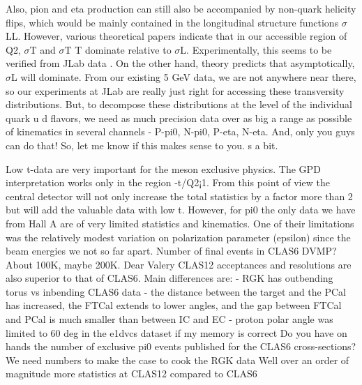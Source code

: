             Also, pion and eta production can still also be accompanied by non-quark helicity flips,
            which would be mainly contained in the longitudinal structure functions $\sigma$LL. However,
            various theoretical papers indicate that in our accessible region of Q2, $\sigma$T and $\sigma$T T dominate
            relative to $\sigma$L. Experimentally, this seems to be verified from JLab data . On the other
            hand, theory predicts that asymptotically, $\sigma$L will dominate. From our existing 5 GeV data,
            we are not anywhere near there, so our experiments at JLab are really just right for accessing
            these transversity distributions. But, to decompose these distributions at the level of the
            individual quark u d flavors, we need as much precision data over as big a range as possible
            of kinematics in several channels - P-pi0, N-pi0, P-eta, N-eta. And, only you guys can do
            that! So, let me know if this makes sense to you. s a bit.
                       
            
            Low t-data are very important for the meson exclusive physics. The GPD interpretation
            works only in the region -t/Q2¡1. From this point of view the central detector will not only
            increase the total statistics by a factor more than 2 but will add the valuable data with low
            t.
            However, for pi0 the only data we have from Hall A are of very limited statistics and
            kinematics. One of their limitations was the relatively modest variation on polarization
            parameter (epsilon) since the beam energies we not so far apart.
            Number of final events in CLAS6 DVMP? About 100K, maybe 200K.
            Dear Valery
            CLAS12 acceptances and resolutions are also superior to that of CLAS6. Main differences
            are: - RGK has outbending torus vs inbending CLAS6 data - the distance between the target
            and the PCal has increased, the FTCal extends to lower angles, and the gap between FTCal
            and PCal is much smaller than between IC and EC - proton polar angle was limited to 60
            deg in the e1dvcs dataset if my memory is correct
            Do you have on hands the number of exclusive pi0 events published for the CLAS6
            cross-sections? We need numbers to make the case to cook the RGK data
            Well over an order of magnitude more statistics at CLAS12 compared to CLAS6


